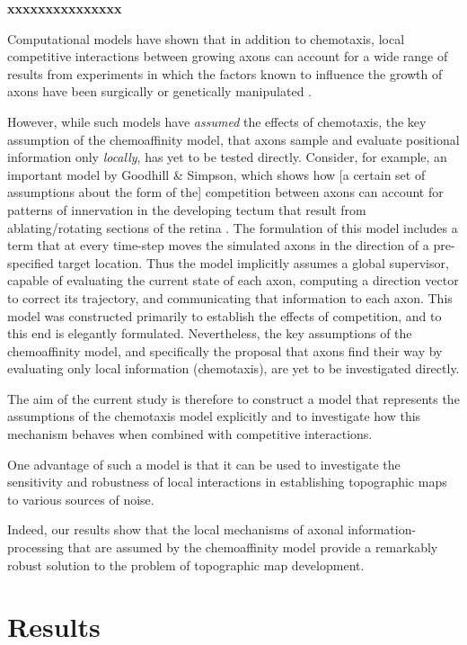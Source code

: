 \documentclass[11pt, a4paper]{article}
\begin{document}
\textbf{xxxxxxxxxxxxxxx}

Computational models have shown that in addition to chemotaxis, local competitive interactions between growing axons can account for a wide range of results from experiments in which the factors known to influence the growth of axons have been surgically or genetically manipulated \citep{prestige_role_1975,simpson_simple_2011,suetterlin_target-independent_2014}.

However, while such models have \emph{assumed} the effects of chemotaxis, the key assumption of the chemoaffinity model, that axons sample and evaluate positional information only \emph{locally}, has yet to be tested directly.
%
Consider, for example, an important model by Goodhill \& Simpson, which shows how [a certain set of assumptions about the form of the] competition between axons can account for patterns of innervation in the developing tectum that result from ablating/rotating sections of the retina \citep{simpson_simple_2011}.
%
The formulation of this model includes a term that at every time-step moves the simulated axons in the direction of a pre-specified target location.
Thus the model implicitly assumes a global supervisor, capable of evaluating the current state of each axon, computing a direction vector to correct its trajectory, and communicating that information to each axon.
%
This model was constructed primarily to establish the effects of competition, and to this end is elegantly formulated.
%
Nevertheless, the key assumptions of the chemoaffinity model, and specifically the proposal that axons find their way by evaluating only local information (chemotaxis), are yet to be investigated directly.

The aim of the current study is therefore to construct a model that represents the assumptions of the chemotaxis model explicitly and to investigate how this mechanism behaves when combined with competitive interactions.

One advantage of such a model is that it can be used to investigate the sensitivity and robustness of local interactions in establishing topographic maps to various sources of noise.

Indeed, our results show that the local mechanisms of axonal information-processing that are assumed by the chemoaffinity model provide a remarkably robust solution to the problem of topographic map development.

\section{Results}
\end{document}
